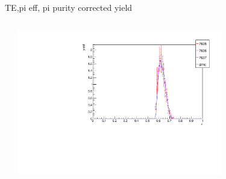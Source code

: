 \begin{frame}{TE,pi eff, pi purity corrected yield}
\begin{columns}
\begin{column}[T]{0.5\textwidth}
\end{column}
\begin{column}[T]{0.5\textwidth}
\includegraphics[width = 0.7\textwidth]{results/yield/check/yieldcheck_420_pos.pdf}
\end{column}
\end{columns}
\end{frame}
